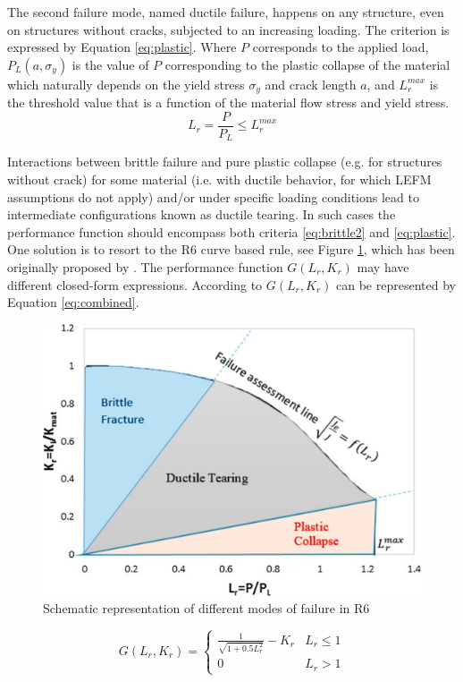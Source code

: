 The second failure mode, named ductile failure, happens on any structure, even on structures without cracks, subjected to an increasing loading. The criterion is expressed by Equation \ref{eq:plastic}.
Where $P$ corresponds to the applied load, $P_L(a, \sigma_y)$ is the value of $P$ corresponding to the plastic collapse of the material which naturally depends on the yield stress $\sigma_y$ and crack 
length $a$, and $L_r^{max}$ is the threshold value that is a function of the material flow stress and yield stress.  
\begin{equation}
 L_r = \frac{P}{P_L} \leq L_r^{max}
 \label{eq:plastic}
\end{equation}

Interactions between brittle failure and pure plastic collapse (e.g. for structures without crack) for some material (i.e. with ductile behavior, for which LEFM assumptions do not apply) and/or under specific 
loading conditions lead to intermediate configurations known as ductile tearing. In such cases the performance function should encompass both criteria \ref{eq:brittle2} and \ref{eq:plastic}. One solution 
is to resort to the R6 curve based rule, see Figure \ref{fig:r6}, which has been originally proposed by \citet{harrison1977}. The performance function $G(L_r, K_r)$ may have different closed-form 
expressions. According to \citet{Kunz:31501} $G(L_r, K_r)$ can be represented by Equation \ref{eq:combined}.

\begin{figure}[hbt!]
\centering
  \includegraphics[width=0.8\linewidth]{figures/fig-ch1/R-6.jpg}
  \caption{Schematic representation of different modes of failure in R6}
  \label{fig:r6}
\end{figure}

\begin{equation}
G(L_r, K_r) =  
\begin{cases}\!%
\frac{1}{\sqrt{1+0.5L_r^2}} - K_r  & L_r \leq1\\
0  & L_r >1
\end{cases}
\label{eq:combined}
\end{equation}

